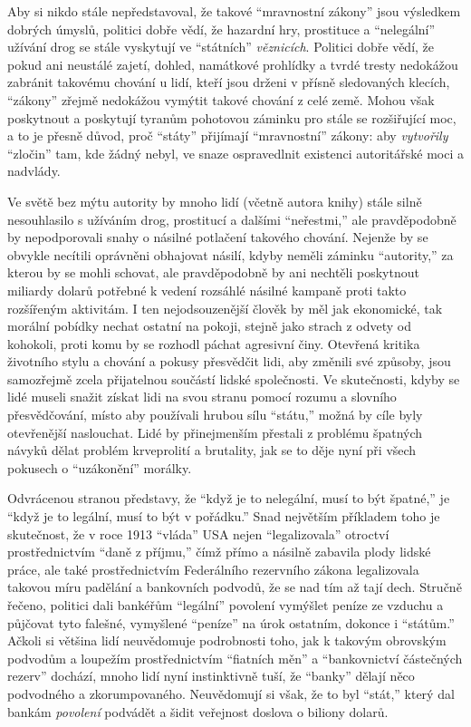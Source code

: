 \documentclass{book}
\begin{document}
Aby si nikdo stále nepředstavoval, že takové \enquote{mravnostní zákony} jsou výsledkem dobrých úmyslů, politici dobře vědí, že hazardní hry, prostituce a \enquote{nelegální} užívání drog se stále vyskytují ve \enquote{státních} \emph{věznicích}. Politici dobře vědí, že pokud ani neustálé zajetí, dohled, namátkové prohlídky a tvrdé tresty nedokážou zabránit takovému chování u lidí, kteří jsou drženi v přísně sledovaných klecích, \enquote{zákony} zřejmě nedokážou vymýtit takové chování z celé země. Mohou však poskytnout a poskytují tyranům pohotovou záminku pro stále se rozšiřující moc, a to je přesně důvod, proč \enquote{státy} přijímají \enquote{mravnostní} zákony: aby \emph{vytvořily} \enquote{zločin} tam, kde žádný nebyl, ve snaze ospravedlnit existenci autoritářské moci a nadvlády.

Ve světě bez mýtu autority by mnoho lidí (včetně autora knihy) stále silně nesouhlasilo s užíváním drog, prostitucí a dalšími \enquote{neřestmi,} ale pravděpodobně by nepodporovali snahy o násilné potlačení takového chování. Nejenže by se obvykle necítili oprávněni obhajovat násilí, kdyby neměli záminku \enquote{autority,} za kterou by se mohli schovat, ale pravděpodobně by ani nechtěli poskytnout miliardy dolarů potřebné k vedení rozsáhlé násilné kampaně proti takto rozšířeným aktivitám. I ten nejodsouzenější člověk by měl jak ekonomické, tak morální pobídky nechat ostatní na pokoji, stejně jako strach z odvety od kohokoli, proti komu by se rozhodl páchat agresivní činy. Otevřená kritika životního stylu a chování a pokusy přesvědčit lidi, aby změnili své způsoby, jsou samozřejmě zcela přijatelnou součástí lidské společnosti. Ve skutečnosti, kdyby se lidé museli snažit získat lidi na svou stranu pomocí rozumu a slovního přesvědčování, místo aby používali hrubou sílu \enquote{státu,} možná by cíle byly otevřenější naslouchat. Lidé by přinejmenším přestali z problému špatných návyků dělat problém krveprolití a brutality, jak se to děje nyní při všech pokusech o \enquote{uzákonění} morálky.

Odvrácenou stranou představy, že \enquote{když je to nelegální, musí to být špatné,} je \enquote{když je to legální, musí to být v pořádku.} Snad největším příkladem toho je skutečnost, že v roce 1913 \enquote{vláda} USA nejen \enquote{legalizovala} otroctví prostřednictvím \enquote{daně z příjmu,} čímž přímo a násilně zabavila plody lidské práce, ale také prostřednictvím Federálního rezervního zákona legalizovala takovou míru padělání a bankovních podvodů, že se nad tím až tají dech. Stručně řečeno, politici dali bankéřům \enquote{legální} povolení vymýšlet peníze ze vzduchu a půjčovat tyto falešné, vymyšlené \enquote{peníze} na úrok ostatním, dokonce i \enquote{státům.} Ačkoli si většina lidí neuvědomuje podrobnosti toho, jak k takovým obrovským podvodům a loupežím prostřednictvím \enquote{fiatních měn} a \enquote{bankovnictví částečných rezerv} dochází, mnoho lidí nyní instinktivně tuší, že \enquote{banky} dělají něco podvodného a zkorumpovaného. Neuvědomují si však, že to byl \enquote{stát,} který dal bankám \emph{povolení} podvádět a šidit veřejnost doslova o biliony dolarů.
\end{document}

